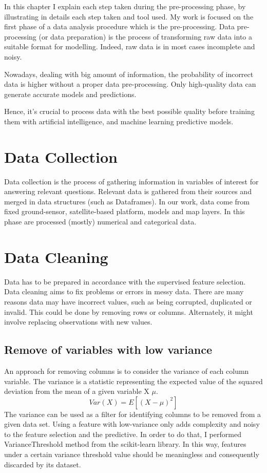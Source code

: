 In this chapter I explain each step taken during the pre-processing phase, by illustrating in details each step taken and tool used. \newline
\bigbreak
My work is focused on the first phase of a data analysis procedure which is the pre-processing.
Data pre-processing (or data preparation) is the process of transforming raw data into a suitable format for modelling. 
Indeed, raw data is in most cases incomplete and noisy.\par
Nowadays, dealing with big amount of information, the probability of incorrect data is higher without a proper data pre-processing.
Only high-quality data can generate accurate models and predictions. \par
Hence, it’s crucial to process data with the best possible quality before training them with artificial intelligence, and machine learning predictive models.\par


\section{Data Collection}
Data collection is the process of gathering information in variables of interest for answering relevant questions. \newline
Relevant data is gathered from their sources and merged in data structures (such as Dataframes). In our work, data come from fixed ground-sensor, satellite-based platform, models and map layers. In this phase are processed (mostly) numerical and categorical data. 
\section{Data Cleaning}
\label{sec:Data cleaning}
Data has to be prepared in accordance with the supervised feature selection.
Data cleaning aims to fix problems or errors in messy data. There are many reasons data may have incorrect values, such as being corrupted, duplicated or invalid. \newline
This could be done by removing rows or columns. Alternately, it might involve replacing observations with new values. \newline

\subsection{Remove of variables with low variance}
An approach for removing columns is to consider the variance of each column variable. The variance is a statistic representing the expected value of the squared deviation from the mean of a given variable X $\mu$. 
\begin{equation}
  Var(X) = E[(X-\mu)^2]
\end{equation}
The variance can be used as a filter for identifying columns to be removed from a given data set. 
Using a feature with low-variance only adds complexity and noisy to the feature selection and the predictive.\newline
In order to do that, I performed VarianceThreshold method from the scikit-learn library. In this way, features under a certain variance threshold value should be meaningless and consequently discarded by its dataset. 
